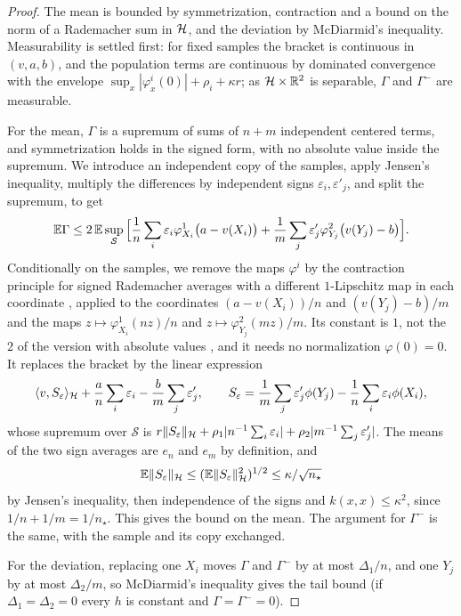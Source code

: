 \begin{proof}
The mean is bounded by symmetrization, contraction and a bound on the norm of a Rademacher sum in $\mathcal{H}$, and the
deviation by McDiarmid's inequality. Measurability is settled first: for fixed samples the bracket is continuous in
$(v,a,b)$, and the population terms are continuous by dominated convergence with the envelope
$\sup_x|\varphi^i_x(0)|+\rho_i+\kappa r$; as $\mathcal{H}\times\mathbb{R}^2$ is separable, $\Gamma$ and $\Gamma^-$ are measurable.

For the mean, $\Gamma$ is a supremum of sums of $n+m$ independent centered terms, and symmetrization holds in the signed
form, with no absolute value inside the supremum. We introduce an independent copy of the samples, apply Jensen's
inequality, multiply the differences by independent signs $\varepsilon_i,\varepsilon'_j$, and split the supremum, to get
\[
\mathbb{E} \Gamma\le2\,\mathbb{E}\sup_{\mathcal S}\Big[\frac1n\sum_i\varepsilon_i\varphi^1_{X_i}\big(a-v(X_i)\big)+\frac1m\sum_j\varepsilon'_j
\varphi^2_{Y_j}\big(v(Y_j)-b\big)\Big].
\]
Conditionally on the samples, we remove the maps $\varphi^i$ by the contraction principle for signed Rademacher
averages with a different $1$-Lipschitz map in each coordinate \citep[Lemma~26.9]{shalevshwartzbendavid2014}, applied
to the coordinates $(a-v(X_i))/n$ and $(v(Y_j)-b)/m$ and the maps $z\mapsto\varphi^1_{X_i}(nz)/n$ and
$z\mapsto\varphi^2_{Y_j}(mz)/m$. Its constant is $1$, not the $2$ of the version with absolute values
\citep[Theorem~4.12]{ledouxtalagrand1991}, and it needs no normalization $\varphi(0)=0$. It replaces the bracket by the
linear expression
\[
\langle v,S_\varepsilon\rangle_{\mathcal{H}}+\frac an\sum_i\varepsilon_i-\frac bm\sum_j\varepsilon'_j,
\qquad
S_\varepsilon=\frac1m\sum_j\varepsilon'_j\phi(Y_j)-\frac1n\sum_i\varepsilon_i\phi(X_i),
\]
whose supremum over $\mathcal S$ is $r\|S_\varepsilon\|_{\mathcal{H}}+\rho_1|n^{-1}\sum_i\varepsilon_i|+\rho_2|m^{-1}\sum_j\varepsilon'_j|$.
The means of the two sign averages are $e_n$ and $e_m$ by definition, and
\[
\mathbb{E}\|S_\varepsilon\|_{\mathcal{H}}\le(\mathbb{E}\|S_\varepsilon\|_{\mathcal{H}}^2)^{1/2}\le\kappa/\sqrt{n_\star}
\]
by Jensen's inequality, then independence of the signs and $k(x,x)\le\kappa^2$, since $1/n+1/m=1/n_\star$. This gives the
bound on the mean. The argument for $\Gamma^-$ is the same, with the sample and its copy exchanged.

For the deviation, replacing one $X_i$ moves $\Gamma$ and $\Gamma^-$ by at most $\Delta_1/n$, and one $Y_j$ by at most
$\Delta_2/m$, so McDiarmid's inequality \citep{mcdiarmid1989} gives the tail bound (if $\Delta_1=\Delta_2=0$ every $h$ is
constant and $\Gamma=\Gamma^-=0$).
\end{proof}

